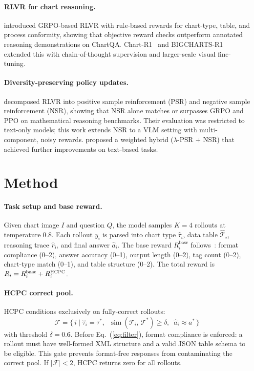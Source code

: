 \documentclass[11pt]{article}
\newcommand{\hcpc}{\textsc{HCPC}}
\newcommand{\rlvr}{\textsc{RLVR}}
\newcommand{\grpo}{\textsc{GRPO}}
\newcommand{\nsr}{\textsc{NSR}}
\begin{document}
\paragraph{RLVR for chart reasoning.}
\citet{sinha2025chartrvr} introduced \grpo-based \rlvr{} with rule-based rewards
for chart-type, table, and process conformity, showing that objective reward checks
outperform annotated reasoning demonstrations on ChartQA.
Chart-R1~\citep{chart_r1} and BIGCHARTS-R1~\citep{bigcharts} extended this with
chain-of-thought supervision and larger-scale visual fine-tuning.

\paragraph{Diversity-preserving policy updates.}
\citet{zhu2025nsr} decomposed \rlvr{} into positive sample reinforcement (PSR)
and negative sample reinforcement (\nsr), showing that \nsr{} alone matches or
surpasses \grpo{} and PPO on mathematical reasoning benchmarks.
Their evaluation was restricted to text-only models; this work extends \nsr{} to
a VLM setting with multi-component, noisy rewards.
\citet{yu2025dapo} proposed a weighted hybrid ($\lambda$-PSR $+$ \nsr) that
achieved further improvements on text-based tasks.

\section{Method}\label{sec:method}

\paragraph{Task setup and base reward.}
Given chart image $I$ and question $Q$, the model samples $K = 4$ rollouts at
temperature 0.8.
Each rollout $y_i$ is parsed into chart type $\hat{\tau}_i$, data table
$\hat{\mathcal{T}}_i$, reasoning trace $\hat{r}_i$, and final answer $\hat{a}_i$.
The base reward $R_i^{\text{base}}$ follows~\citet{sinha2025chartrvr}: format
compliance (0--2), answer accuracy (0--1), output length (0--2), tag count (0--2),
chart-type match (0--1), and table structure (0--2).
The total reward is $R_i = R_i^{\text{base}} + R_i^{\hcpc}$.

\paragraph{HCPC correct pool.}
\hcpc{} conditions exclusively on fully-correct rollouts:
%
\begin{equation}
  \mathcal{F} = \bigl\{\, i \;\big|\;
    \hat{\tau}_i = \tau^*,\;\;
    \operatorname{sim}(\hat{\mathcal{T}}_i,\, \mathcal{T}^*) \ge \delta,\;\;
    \hat{a}_i \approx a^*
  \,\bigr\}
  \label{eq:filter}
\end{equation}
%
with threshold $\delta = 0.6$.
Before Eq.~(\ref{eq:filter}), format compliance is enforced: a rollout must
have well-formed XML structure and a valid JSON table schema to be eligible.
This gate prevents format-free responses from contaminating the correct pool.
If $|\mathcal{F}| < 2$, \hcpc{} returns zero for all rollouts.
\end{document}
